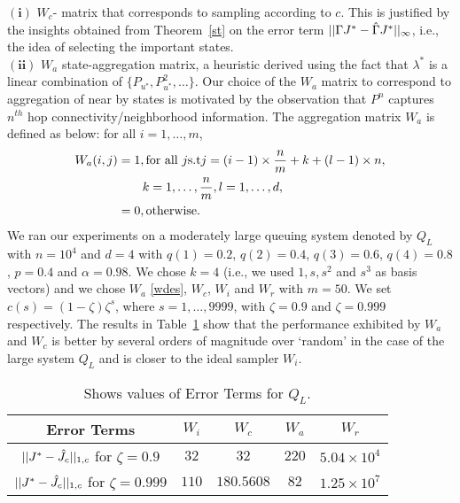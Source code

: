 {$\mathbf{(i)}$} $W_c$- matrix that corresponds to sampling according to $c$. This is justified by the insights obtained from Theorem~\ref{st} on the error term $||\Gamma J^*-\hat{\Gamma} J^*||_\infty$, i.e., the idea of selecting the important states.\\
{$\mathbf{(ii)}$} $W_a$ state-aggregation matrix, a heuristic derived using the fact that $\lambda^*$ is a linear combination of $\{P_{u^*},P^2_{u^*},\ldots\}$. Our choice of the $W_a$ matrix to correspond to aggregation of near by states is motivated by the observation that $P^n$ captures $n^{th}$ hop connectivity/neighborhood information.
The aggregation matrix $W_a$ is defined as below: for all $ i=1,\ldots,m$,
\begin{align}\label{wdes}
W_a(i,j)&=1, \mb\text{for all } j\mb\text{s.t}\mb j=(i-1)\times\frac{n}{m}+k+(l-1)\times n, \nn\\&\mb\quad\quad k=1,\ldots,\frac{n}{m}, l=1,\ldots,d,\nn\\
&=0,\mb\text{otherwise}.
\end{align}
We ran our experiments on a moderately large queuing system denoted by $Q_L$ with $n=10^4$ and $d=4$ with $q(1)=0.2$, $q(2)=0.4$, $q(3)=0.6$, $q(4)=0.8$, $p=0.4$ and $\alpha=0.98$. We chose $k=4$ (i.e., we used $1, s,s^2$ and $s^3$ as basis vectors) and we chose $W_a$ \eqref{wdes}, $W_c$, $W_i$ and $W_r$ with $m=50$. We set $c(s)=(1-\zeta) \zeta^s$, where $s=1,\ldots,9999$, with $\zeta=0.9$ and $\zeta=0.999$ respectively. The results in Table~\ref{pref} show that the performance exhibited by $W_a$ and $W_c$ is better by several orders of magnitude over `random' in the case of the large system $Q_L$ and is closer to the ideal sampler $W_i$.
\FloatBarrier
\begin{table}[H]
\begin{center}
\begin{tabular}{|c|c|c|c|c|}\hline
Error Terms&	$W_i$&	$W_c$& $W_a$& $W_r$ \\\hline
$||J^*-\hat{J}_c||_{1,c}$ for $\zeta=0.9$& $32$&	$32$& $220$& $5.04\times 10^4$ \\\hline
$||J^*-\hat{J}_c||_{1,c}$ for $\zeta=0.999$& $110$&	$180.5608$& $82$& $1.25\times 10^7$ \\\hline
\end{tabular}
\end{center}
\caption{Shows values of Error Terms for $Q_L$.}
\label{pref}
\end{table}

